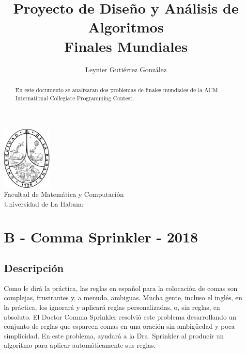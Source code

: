 \documentclass[12pt]{article}
\title{Proyecto de Diseño y Análisis de Algoritmos\\ \vspace{.2cm} \textbf{Finales Mundiales}}
\author{Leynier Gutiérrez González}
\begin{document}
	
\maketitle

\vspace{0.5cm}

\begin{center}
	\vspace{0.2cm}
	\includegraphics[width=2.5cm]{images/escudo.png}\\
	\vspace{0.2cm}
	Facultad de Matemática y Computación\\
	\vspace{0.1cm}
	Universidad de La Habana\\
	\vspace{1cm}
\end{center}

\vspace{1cm}

\begin{abstract}
	En este documento se analizaran dos problemas de finales mundiales de la ACM International Collegiate Programming Contest.
\end{abstract}

\newpage

\tableofcontents

\newpage

\section{B - Comma Sprinkler - 2018}

\subsection{Descripción}

Como le dirá la práctica, las reglas en español para la colocación de comas son complejas, frustrantes y, a menudo, ambiguas. Mucha gente, incluso el inglés, en la práctica, los ignorará y aplicará reglas personalizadas, o, sin reglas, en absoluto. El Doctor Comma Sprinkler resolvió este problema desarrollando un conjunto de reglas que esparcen comas en una oración sin ambigüedad y poca simplicidad. En este problema, ayudará a la Dra. Sprinkler al producir un algoritmo para aplicar automáticamente sus reglas.
\end{document}
